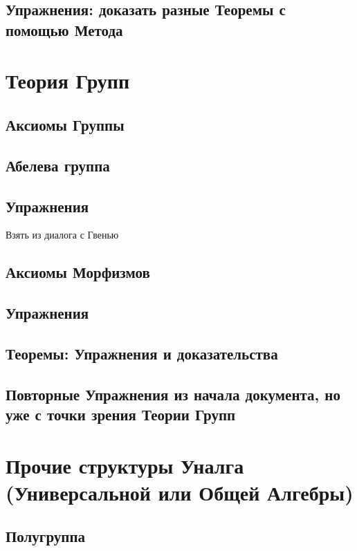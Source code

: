\documentclass{book}
\begin{document}
\section{Упражнения: доказать разные Теоремы с помощью Метода}

\chapter{Теория Групп}

\section{Аксиомы Группы}

\section{Абелева группа}

\section{Упражнения}

Взять из диалога с Гвенью

\section{Аксиомы Морфизмов}

\section{Упражнения}

\section{Теоремы: Упражнения и доказательства}

\section{Повторные Упражнения из начала документа, но уже с точки зрения Теории Групп}

\chapter{Прочие структуры Уналга (Универсальной или Общей Алгебры)}

\section{Полугруппа}
\end{document}
